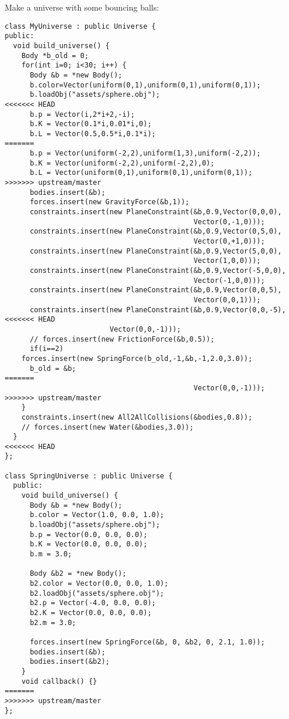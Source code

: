 \noindent
Make a universe with some bouncing balls: \begin{lstlisting}
class MyUniverse : public Universe {
public:
  void build_universe() {
    Body *b_old = 0;
    for(int i=0; i<30; i++) {
      Body &b = *new Body();
      b.color=Vector(uniform(0,1),uniform(0,1),uniform(0,1));
      b.loadObj("assets/sphere.obj");
<<<<<<< HEAD
      b.p = Vector(i,2*i+2,-i);
      b.K = Vector(0.1*i,0.01*i,0);
      b.L = Vector(0.5,0.5*i,0.1*i);
=======
      b.p = Vector(uniform(-2,2),uniform(1,3),uniform(-2,2));
      b.K = Vector(uniform(-2,2),uniform(-2,2),0);
      b.L = Vector(uniform(0,1),uniform(0,1),uniform(0,1));
>>>>>>> upstream/master
      bodies.insert(&b);
      forces.insert(new GravityForce(&b,1));
      constraints.insert(new PlaneConstraint(&b,0.9,Vector(0,0,0),
                                             Vector(0,-1,0)));
      constraints.insert(new PlaneConstraint(&b,0.9,Vector(0,5,0),
                                             Vector(0,+1,0)));
      constraints.insert(new PlaneConstraint(&b,0.9,Vector(5,0,0),
                                             Vector(1,0,0)));
      constraints.insert(new PlaneConstraint(&b,0.9,Vector(-5,0,0),
                                             Vector(-1,0,0)));
      constraints.insert(new PlaneConstraint(&b,0.9,Vector(0,0,5),
                                             Vector(0,0,1)));
      constraints.insert(new PlaneConstraint(&b,0.9,Vector(0,0,-5),
<<<<<<< HEAD
					     Vector(0,0,-1)));
      // forces.insert(new FrictionForce(&b,0.5));
      if(i==2)
	forces.insert(new SpringForce(b_old,-1,&b,-1,2.0,3.0));
      b_old = &b;
=======
                                             Vector(0,0,-1)));
>>>>>>> upstream/master
    }
    constraints.insert(new All2AllCollisions(&bodies,0.8));
    // forces.insert(new Water(&bodies,3.0));
  }
<<<<<<< HEAD
};

class SpringUniverse : public Universe {
  public:
    void build_universe() {
      Body &b = *new Body();
      b.color = Vector(1.0, 0.0, 1.0);
      b.loadObj("assets/sphere.obj");
      b.p = Vector(0.0, 0.0, 0.0);
      b.K = Vector(0.0, 0.0, 0.0);
      b.m = 3.0;
 
      Body &b2 = *new Body();
      b2.color = Vector(0.0, 0.0, 1.0);
      b2.loadObj("assets/sphere.obj");
      b2.p = Vector(-4.0, 0.0, 0.0);
      b2.K = Vector(0.0, 0.0, 0.0);
      b2.m = 3.0;

      forces.insert(new SpringForce(&b, 0, &b2, 0, 2.1, 1.0));
      bodies.insert(&b);
      bodies.insert(&b2);
    }
    void callback() {}
=======
>>>>>>> upstream/master
};
\end{lstlisting}
